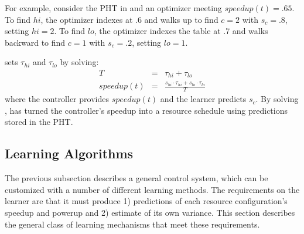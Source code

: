 For example, consider the PHT in  and an optimizer
meeting $speedup(t) = .65$.  To find $hi$, the optimizer indexes at .6
and walks up to find $c=2$ with $s_c=.8$, setting $hi = 2$.  To find
$lo$, the optimizer indexes the table at .7 and walks backward to find
$c=1$ with $s_c=.2$, setting $lo = 1$.

\SYSTEM{} sets $\tau_{hi}$ and $\tau_{lo}$ by solving:
\begin{eqnarray}
  T &=& \tau_{hi} + \tau_{lo}    \label{eqn:s1} \\
  speedup(t) &=& \frac{s_{hi} \cdot \tau_{hi} + s_{lo} \cdot \tau_{lo}}{T} \label{eqn:s2}
\end{eqnarray}
where the controller provides $speedup(t)$ and the learner predicts
$s_c$.  By solving , \SYSTEM{} has turned the
controller's speedup into a resource schedule using predictions stored
in the PHT.

\subsection{\SYSTEM{} Learning Algorithms}
The previous subsection describes a general control system, which can
be customized with a number of different learning methods.  The
requirements on the learner are that it must produce 1) predictions of
each resource configuration's speedup and powerup and 2) estimate of
its own variance.
This section describes the general class of learning mechanisms that
meet these requirements. 


